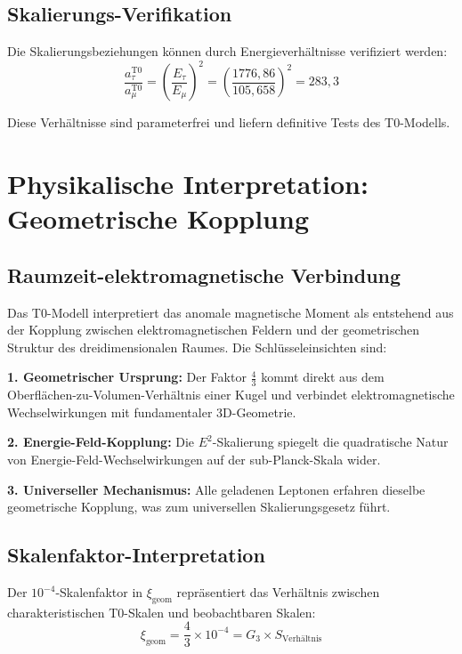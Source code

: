 \documentclass[12pt,a4paper]{report}
\newcommand{\xigeom}{\xi_{\text{geom}}}   %
\newcommand{\Emu}{E_\mu}                  %
\newcommand{\Etau}{E_\tau}                %
\begin{document}
	\subsection{Skalierungs-Verifikation}
	\label{subsec:scaling_verification}
	
	Die Skalierungsbeziehungen können durch Energieverhältnisse verifiziert werden:
	\begin{equation}
		\frac{a_\tau^{\text{T0}}}{a_\mu^{\text{T0}}} = \left(\frac{\Etau}{\Emu}\right)^2 = \left(\frac{1776,86}{105,658}\right)^2 = 283,3
		\label{eq:tau_muon_ratio}
	\end{equation}
	
	Diese Verhältnisse sind parameterfrei und liefern definitive Tests des T0-Modells.
	
	\section{Physikalische Interpretation: Geometrische Kopplung}
	\label{sec:physical_interpretation}
	
	\subsection{Raumzeit-elektromagnetische Verbindung}
	\label{subsec:spacetime_electromagnetic}
	
	Das T0-Modell interpretiert das anomale magnetische Moment als entstehend aus der Kopplung zwischen elektromagnetischen Feldern und der geometrischen Struktur des dreidimensionalen Raumes. Die Schlüsseleinsichten sind:
	
	\textbf{1. Geometrischer Ursprung:}
	Der Faktor $\frac{4}{3}$ kommt direkt aus dem Oberflächen-zu-Volumen-Verhältnis einer Kugel und verbindet elektromagnetische Wechselwirkungen mit fundamentaler 3D-Geometrie.
	
	\textbf{2. Energie-Feld-Kopplung:}
	Die $E^2$-Skalierung spiegelt die quadratische Natur von Energie-Feld-Wechselwirkungen auf der sub-Planck-Skala wider.
	
	\textbf{3. Universeller Mechanismus:}
	Alle geladenen Leptonen erfahren dieselbe geometrische Kopplung, was zum universellen Skalierungsgesetz führt.
	
	\subsection{Skalenfaktor-Interpretation}
	\label{subsec:scale_factor}
	
	Der $10^{-4}$-Skalenfaktor in $\xigeom$ repräsentiert das Verhältnis zwischen charakteristischen T0-Skalen und beobachtbaren Skalen:
	\begin{equation}
		\xigeom = \frac{4}{3} \times 10^{-4} = G_3 \times S_{\text{Verhältnis}}
		\label{eq:scale_interpretation}
	\end{equation}
	
\end{document}
